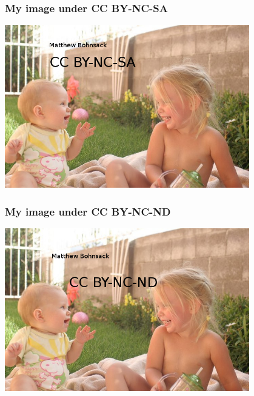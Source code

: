 \documentclass[mathserif,xcolor=dvipsnames,hyperref={bookmarks=true}]{beamer}
\begin{document}
\begin{frame}[t]
    \frametitle{My image under CC BY-NC-SA}
    \begin{center}
        \includegraphics[width=0.8\textwidth]{../images/mine/cc-by-nc-sa.jpg}
    \end{center}
\end{frame}
\begin{frame}[t]
    \frametitle{My image under CC BY-NC-ND}
    \begin{center}
        \includegraphics[width=0.8\textwidth]{../images/mine/cc-by-nc-nd.jpg}
    \end{center}
\end{frame}
\end{document}
